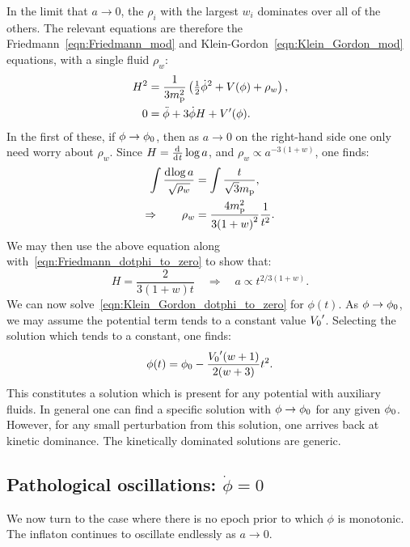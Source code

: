 In the limit that \(a\to 0\), the \(\rho_i\) with the largest \(w_i\) dominates over all of the others. The relevant equations are therefore the Friedmann~\eqref{eqn:Friedmann_mod} and Klein-Gordon~\eqref{eqn:Klein_Gordon_mod} equations, with a single fluid \(\rho_w\):
\begin{align}
  H^2
  &=
  \frac{1}{3m_{\mathrm{p}}^2}\left({\textstyle\frac{1}{2}}\dot{\phi}^2
  + V(\phi)
  + \rho_w \right),
  \label{eqn:Friedmann_dotphi_to_zero} \\
  0
  &=
  \ddot{\phi} +3\dot{\phi}H + V^\prime(\phi).
  \label{eqn:Klein_Gordon_dotphi_to_zero}
\end{align}
In the first of these, if \(\phi\to\phi_0\), then as \(a\to0\) on the right-hand side one only need worry about \(\rho_w\). Since \(H=\frac{\operatorname{d}^{}\!{}}{\operatorname{d}^{}\!{t}}\log a\), and \(\rho_w\propto a^{-3(1+w)}\), one finds:
\begin{align}
  \int\frac{\operatorname{d}^{}\!{\log a}}{\sqrt{\rho_w}}
  &=
  \int\frac{t}{\sqrt3m_{\mathrm{p}}},
  \\
  \Rightarrow \qquad \rho_w
  &=
  \frac{4m_{\mathrm{p}}^2}{3{(1+w)}^2} \frac{1}{t^2}.
  \label{eqn:rho_dotphi_to_zero}
\end{align}
We may then use the above equation along with~\eqref{eqn:Friedmann_dotphi_to_zero} to show that:
\begin{equation}
  H = \frac{2}{3(1+w) t}
  \quad
  \Rightarrow \quad a\propto t^{2/3(1+w)}.
  \label{eqn:H_dotphi_to_zero}
\end{equation}
We can now solve~\eqref{eqn:Klein_Gordon_dotphi_to_zero} for \(\phi(t)\).  As \(\phi\to\phi_0\), we may assume the potential term tends to a constant value \({{V_0}^\prime}\). Selecting the solution which tends to a constant, one finds:
\begin{equation}
  \phi(t) = \phi_0 -\frac{{{V_0}^\prime}(w+1)}{2(w+3)}t^2.
\end{equation}
This constitutes a solution which is present for any potential with auxiliary fluids. In general one can find a specific solution with \(\phi\to\phi_0\) for any given \(\phi_0\). However, for any small perturbation from this solution, one arrives back at kinetic dominance. The kinetically dominated solutions are generic. 












\subsection{Pathological oscillations: \(\dot{\phi}=0\)}
\label{sec:pathological_oscillations}
We now turn to the case where there is no epoch prior to which \(\phi\) is monotonic. The inflaton continues to oscillate endlessly as \(a\to0\). 

